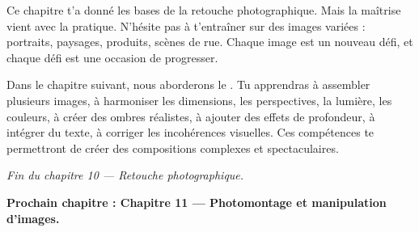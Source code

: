 Ce chapitre t'a donné les bases de la retouche photographique. Mais la maîtrise vient avec la pratique. N'hésite pas à t'entraîner sur des images variées : portraits, paysages, produits, scènes de rue. Chaque image est un nouveau défi, et chaque défi est une occasion de progresser.

Dans le chapitre suivant, nous aborderons le . Tu apprendras à assembler plusieurs images, à harmoniser les dimensions, les perspectives, la lumière, les couleurs, à créer des ombres réalistes, à ajouter des effets de profondeur, à intégrer du texte, à corriger les incohérences visuelles. Ces compétences te permettront de créer des compositions complexes et spectaculaires.

\vspace{2em}

\begin{center}
\textit{Fin du chapitre 10 --- Retouche photographique.}

\vspace{1em}

\textbf{Prochain chapitre : Chapitre 11 --- Photomontage et manipulation d'images.}
\end{center}